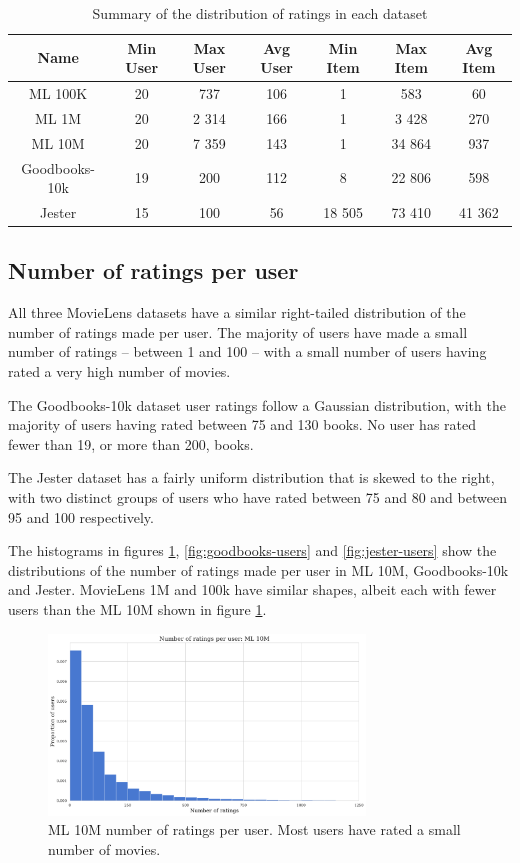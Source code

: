 \begin{table}[H]
\centering
\begin{tabular}{c | c | c | c | c | c | c}
\toprule
\textbf{Name} & \textbf{Min User} & \textbf{Max User} & \textbf{Avg User} & \textbf{Min Item} & \textbf{Max Item} & \textbf{Avg Item} \\
\midrule
ML 100K & 20 & 737 & 106 & 1 & 583 & 60 \\
ML 1M & 20 & 2 314 & 166 & 1 & 3 428 & 270 \\
ML 10M & 20 & 7 359 & 143 & 1 & 34 864 & 937 \\
Goodbooks-10k & 19 & 200 & 112 & 8 & 22 806 & 598 \\
Jester & 15 & 100 & 56 & 18 505 & 73 410 & 41 362 \\
\bottomrule
\end{tabular}
\caption[Ratings distribution]{Summary of the distribution of ratings in each dataset}
\label{tab:ratings-distribution}
\end{table}

\subsection{Number of ratings per user}
All three MovieLens datasets have a similar right-tailed distribution of the number of ratings made per user. The majority of users have made a small number of ratings -- between 1 and 100 -- with a small number of users having rated a very high number of movies.

The Goodbooks-10k dataset user ratings follow a Gaussian distribution, with the majority of users having rated between 75 and 130 books. No user has rated fewer than 19, or more than 200, books.

The Jester dataset has a fairly uniform distribution that is skewed to the right, with two distinct groups of users who have rated between 75 and 80 and between 95 and 100 respectively.

The histograms in figures \ref{fig:ML10M-users}, \ref{fig:goodbooks-users} and \ref{fig:jester-users} show the distributions of the number of ratings made per user in ML 10M, Goodbooks-10k and Jester. MovieLens 1M and 100k have similar shapes, albeit each with fewer users than the ML 10M shown in figure \ref{fig:ML10M-users}.

\begin{figure}[H]
\centering
\includegraphics[width=0.75\textwidth]{Figures/3_ratings-distributions/ml_10m_user-ratings.pdf}
\caption{ML 10M number of ratings per user. Most users have rated a small number of movies.}
\label{fig:ML10M-users}
\end{figure}

